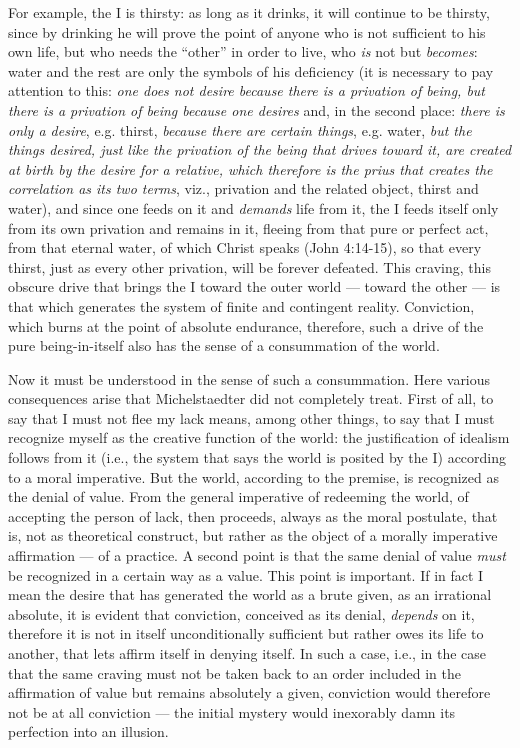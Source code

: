 For example, the I is thirsty: as long as it drinks, it will continue to be thirsty, since by drinking he will prove the point of anyone who is not sufficient to his own life, but who needs the ``other'' in order to live, who \emph{is} not but \emph{becomes}: water and the rest are only the symbols of his deficiency (it is necessary to pay attention to this: \emph{one does not desire because there is a privation of being, but there is a privation of being because one desires} and, in the second place: \emph{there is only a desire}, e.g. thirst, \emph{because there are certain things}, e.g. water, \emph{but the things desired, just like the privation of the being that drives toward it, are created at birth by the desire for a relative, which therefore is the prius that creates the correlation as its two terms}, viz., privation and the related object, thirst and water), and since one feeds on it and \emph{demands} life from it, the I feeds itself only from its own privation and remains in it, fleeing from that pure or perfect act, from that eternal water, of which Christ speaks (John 4:14-15), so that every thirst, just as every other privation, will be forever defeated. This craving, this obscure drive that brings the I toward the outer world --- toward the other --- is that which generates the system of finite and contingent reality. Conviction, which burns at the point of absolute endurance, therefore, such a drive of the pure being-in-itself also has the sense of a consummation of the world.

Now it must be understood in the sense of such a consummation. Here various consequences arise that Michelstaedter did not completely treat. First of all, to say that I must not flee my lack means, among other things, to say that I must recognize myself as the creative function of the world: the justification of idealism follows from it (i.e., the system that says the world is posited by the I) according to a moral imperative. But the world, according to the premise, is recognized as the denial of value. From the general imperative of redeeming the world, of accepting the person of lack, then proceeds, always as the moral postulate, that is, not as theoretical construct, but rather as the object of a morally imperative affirmation --- of a practice. A second point is that the same denial of value \emph{must} be recognized in a certain way as a value. This point is important. If in fact I mean the desire that has generated the world as a brute given, as an irrational absolute, it is evident that conviction, conceived as its denial, \emph{depends} on it, therefore it is not in itself unconditionally sufficient but rather owes its life to another, that lets affirm itself in denying itself. In such a case, i.e., in the case that the same craving must not be taken back to an order included in the affirmation of value but remains absolutely a given, conviction would therefore not be at all conviction --- the initial mystery would inexorably damn its perfection into an illusion.

